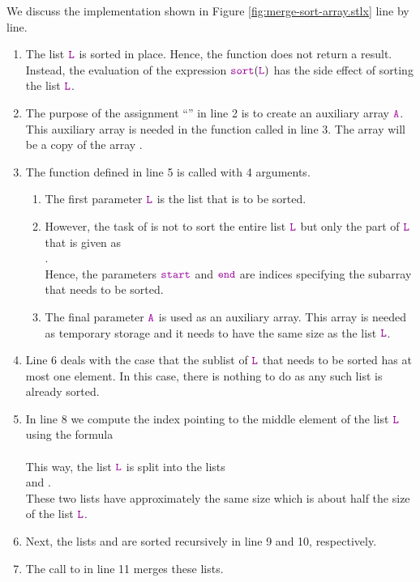 We discuss the implementation shown in Figure \ref{fig:merge-sort-array.stlx} line by line.
\begin{enumerate}
\item The list $\mytt{L}$ is sorted in place. Hence, the function 
       does not return a result.  Instead, the evaluation of the expression
      $\mytt{sort}(\mytt{L})$ has the side effect of sorting the list $\mytt{L}$.
\item The purpose of the assignment ``'' in line 2 is to create an auxiliary array
      $\mytt{A}$.  This auxiliary array is needed in the function  called in line 3.
      The array  will be a copy of the array .
\item The function  defined in line 5 is called with 4 arguments.
      \begin{enumerate}
      \item The first parameter $\mytt{L}$ is the list that is to be sorted.
      \item However, the task of  is not to sort the entire list $\mytt{L}$ but only
            the part of $\mytt{L}$ that is given as
            \\[0.2cm]
            \hspace*{1.3cm} 
            . 
            \\[0.2cm]
            Hence, the parameters $\mytt{start}$ and $\mytt{end}$ are indices specifying the 
            subarray that needs to be sorted.
      \item The final parameter $\mytt{A}$ is used as an auxiliary array.  This array is needed
            as temporary storage and it needs to have the same size as the list $\mytt{L}$.
      \end{enumerate} 
\item Line 6 deals with the case that the sublist of $\mytt{L}$ that needs to be sorted has at most one element.  
      In this case, there is nothing to do as any such list is already sorted.
\item In line 8 we compute the index pointing to the middle element of the list $\mytt{L}$ using the
      formula \\[0.2cm]
      \hspace*{1.3cm} 
      \\[0.2cm]
      This way, the list $\mytt{L}$ is split into the lists 
      \\[0.2cm]
      \hspace*{1.3cm}
       \quad and \quad {}.
      \\[0.2cm]
      These two lists have approximately the same size which is about half the size of the list $\mytt{L}$.
\item Next, the lists  and  are sorted
      recursively in line 9 and 10, respectively.
\item The call to  in line 11 merges these lists.
\end{enumerate}

